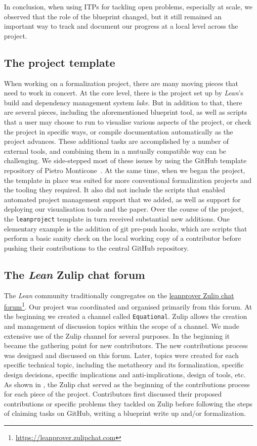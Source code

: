 \documentclass[12pt]{amsart}
\theoremstyle{definition}
\begin{document}
In conclusion, when using ITPs for tackling open problems, especially at scale, we observed that the role of the blueprint changed, but it still remained an important way to track and document our progress at a local level across the project.

\subsection{The project template}
When working on a formalization project, there are many moving pieces that need to work in concert. At the core level, there is the project set up by \emph{Lean}'s build and dependency management system \emph{lake}. But in addition to that, there are several pieces, including the aforementioned blueprint tool, as well as scripts that a user may choose to run to visualise various aspects of the project, or check the project in specific ways, or compile documentation automatically as the project advances. These additional tasks are accomplished by a number of external tools, and combining them in a mutually compatible way can be challenging. We side-stepped most of these issues by using the GitHub template repository of Pietro Monticone~\cite{Monticone_LeanProject_2025}. At the same time, when we began the project, the template in place was suited for more conventional formalization projects and the tooling they required. It also did not include the scripts that enabled automated project management support that we added, as well as support for deploying our visualisation tools and the paper. Over the course of the project, the \texttt{leanproject} template in turn received substantial new additions. One elementary example is the addition of git pre-push hooks, which are scripts that perform a basic sanity check on the local working copy of a contributor before pushing their contributions to the central GitHub repository.

\subsection{The \emph{Lean} Zulip chat forum}
The \emph{Lean} community traditionally congregates on the \href{https://leanprover.zulipchat.com}{leanprover Zulip chat forum}\footnote{\url{https://leanprover.zulipchat.com}}. Our project was coordinated and organised primarily from this forum. At the beginning we created a channel called \texttt{Equational}. Zulip allows the creation and management of discussion topics within the scope of a channel. We made extensive use of the Zulip channel for several purposes. In the beginning it became the gathering point for new contributors. The new contributions process was designed and discussed on this forum. Later, topics were created for each specific technical topic, including the metatheory and its formalization, specific design decisions, specific implications and anti-implications, design of tools, etc. As shown in , the Zulip chat served as the beginning of the contributions process for each piece of the project. Contributors first discussed their proposed contributions or specific problems they tackled on Zulip before following the steps of claiming tasks on GitHub, writing a blueprint write up and/or formalization.
\end{document}
